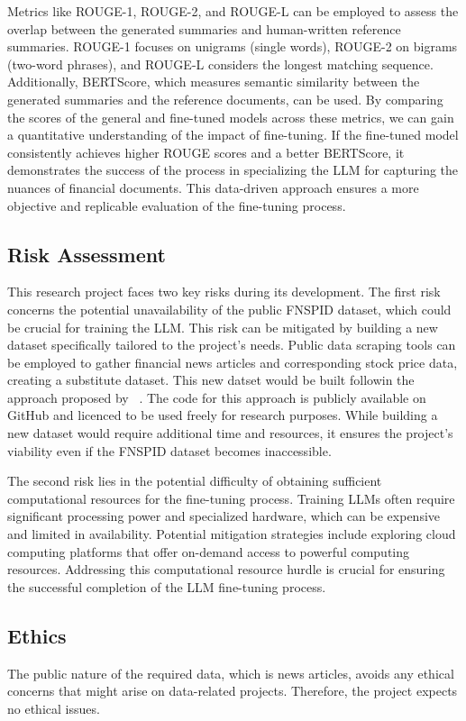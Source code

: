 Metrics like ROUGE-1, ROUGE-2, and ROUGE-L can be employed to assess the overlap between the generated summaries and
human-written reference summaries.
ROUGE-1 focuses on unigrams (single words), ROUGE-2 on bigrams (two-word phrases), and ROUGE-L considers the longest
matching sequence.
Additionally, BERTScore, which measures semantic similarity between the generated summaries and the reference documents,
can be used.
By comparing the scores of the general and fine-tuned models across these metrics, we can gain a quantitative
understanding of the impact of fine-tuning.
If the fine-tuned model consistently achieves higher ROUGE scores and a better BERTScore, it demonstrates the success of
the process in specializing the LLM for capturing the nuances of financial documents.
This data-driven approach ensures a more objective and replicable evaluation of the fine-tuning process.


\subsection{Risk Assessment}\label{subsec:risk-assessment}
This research project faces two key risks during its development.
The first risk concerns the potential unavailability of the public FNSPID dataset, which could be crucial for training
the LLM.  This risk can be mitigated by building a new dataset specifically tailored to the project's needs.
Public data scraping tools can be employed to gather financial news articles and corresponding stock price data,
creating a substitute dataset.
This new datset would be built followin the approach proposed by ~\cite{Dong2024}.
The code for this approach is publicly available on GitHub and licenced to be used freely for research purposes.
While building a new dataset would require additional time and resources, it ensures the project's viability even if
the FNSPID dataset becomes inaccessible.

The second risk lies in the potential difficulty of obtaining sufficient computational resources for the fine-tuning
process.
Training LLMs often require significant processing power and specialized hardware, which can be expensive and limited in
availability.
Potential mitigation strategies include exploring cloud computing platforms that offer on-demand access to powerful
computing resources.
Addressing this computational resource hurdle is crucial for ensuring the successful completion of the LLM fine-tuning
process.


\subsection{Ethics}\label{subsec:ethics}
The public nature of the required data, which is news articles, avoids any ethical concerns that might arise on
data-related projects.
Therefore, the project expects no ethical issues.
